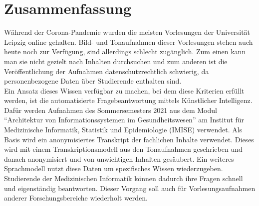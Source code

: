 \chapter*{Zusammenfassung}



Während der Corona-Pandemie wurden die meisten Vorlesungen der Universität Leipzig online gehalten. 
Bild- und Tonaufnahmen dieser Vorlesungen stehen auch heute noch zur Verfügung, sind allerdings schlecht zugänglich. 
Zum einen kann man sie nicht gezielt nach Inhalten durchsuchen und zum anderen ist die Veröffentlichung der Aufnahmen datenschutzrechtlich schwierig, da personenbezogene Daten über Studierende enthalten sind.\\ 
Ein Ansatz dieses Wissen verfügbar zu machen, bei dem diese Kriterien erfüllt werden, ist die automatisierte Fragebeantwortung mittels Künstlicher Intelligenz.
Dafür werden Aufnahmen des Sommersemesters 2021 aus dem Modul \enquote{Architektur von Informationssystemen im Gesundheitswesen} am Institut für Medizinische Informatik, Statistik und Epidemiologie (IMISE) verwendet. 
Als Basis wird ein anonymisiertes Transkript der fachlichen Inhalte verwendet. 
Dieses wird mit einem Transkriptionsmodell aus den Tonaufnahmen geschrieben und danach anonymisiert und von unwichtigen Inhalten gesäubert.
Ein weiteres Sprachmodell nutzt diese Daten um spezifisches Wissen wiederzugeben.
Studierende der Medizinischen Informatik können dadurch ihre Fragen schnell und eigenständig beantworten.
Dieser Vorgang soll auch für Vorlesungsaufnahmen anderer Forschungsbereiche wiederholt werden.\\\\

\vfill